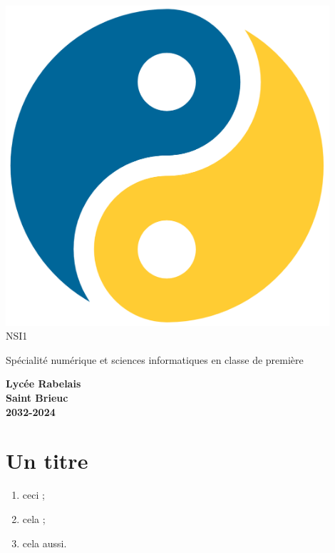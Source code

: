 \documentclass{nsibook}
\begin{document}
\begin{titlepage}
    \begin{center}
        \includegraphics[width=12cm]{yin_yang_python.png}\\[2em]

        {\bigtitlefont \LARGE\color{gray} NSI1}

        {\titlefont\Large\color{gray} Spécialité numérique et sciences informatiques en classe de première\\[2em]}

        {\color{gray}\textbf{Lycée Rabelais\\ Saint Brieuc\\ 2032-2024}}
    \end{center}
\end{titlepage}
\chapter{Un titre}
 
\begin{aretenir}
    \begin{enumerate}[--]
        \item ceci ;
        \item cela ;
        \item cela aussi.
    \end{enumerate}
\end{aretenir}
\end{document}
